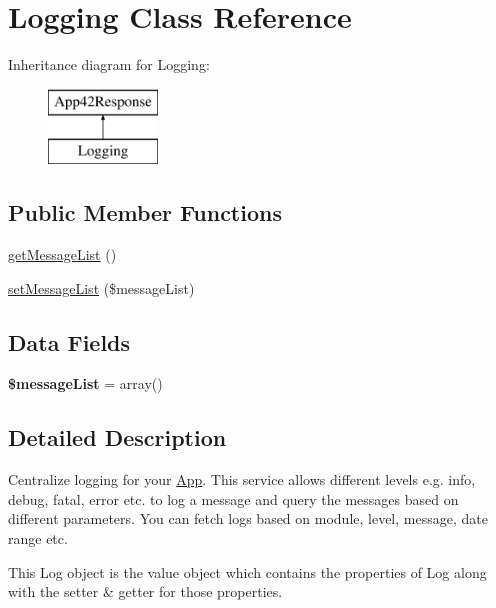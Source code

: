 \hypertarget{class_logging}{\section{Logging Class Reference}
\label{class_logging}
}
Inheritance diagram for Logging\+:\begin{figure}[H]
\begin{center}
\leavevmode
\includegraphics[height=2.000000cm]{class_logging}
\end{center}
\end{figure}
\subsection*{Public Member Functions}
\begin{DoxyCompactItemize}
\item 
\hyperlink{class_logging_a9977be76b67ba4e74a0e97e6c81d168e}{get\+Message\+List} ()
\item 
\hyperlink{class_logging_a61fc28b34a0b1f70c7a1b10cc6cf6ceb}{set\+Message\+List} (\$message\+List)
\end{DoxyCompactItemize}
\subsection*{Data Fields}
\begin{DoxyCompactItemize}
\item 
\hypertarget{class_logging_af6d5791fcb5d1c5fc1a0ee406d6ca81f}{{\bfseries \$message\+List} = array()}\label{class_logging_af6d5791fcb5d1c5fc1a0ee406d6ca81f}

\end{DoxyCompactItemize}


\subsection{Detailed Description}
Centralize logging for your \hyperlink{class_app}{App}. This service allows different levels e.\+g. info, debug, fatal, error etc. to log a message and query the messages based on different parameters. You can fetch logs based on module, level, message, date range etc.

This Log object is the value object which contains the properties of Log along with the setter \& getter for those properties. 

